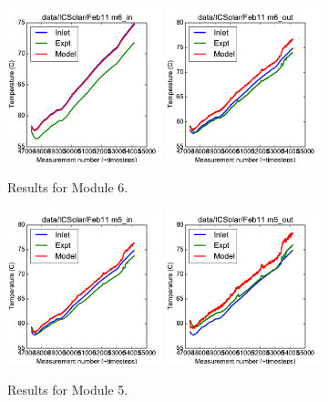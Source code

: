\documentclass{article}
\begin{document}
\begin{figure}[!ht]
\centering
\includegraphics[width=0.4\textwidth]{../../data/ICSolar/images/Feb11_m6_in_unsteady.pdf}\hspace{0.05\textwidth}
\includegraphics[width=0.4\textwidth]{../../data/ICSolar/images/Feb11_m6_out_unsteady.pdf}\hspace{0.05\textwidth}\\
\caption{Results for Module 6.}\end{figure}
\begin{figure}[!ht]
\centering
\includegraphics[width=0.4\textwidth]{../../data/ICSolar/images/Feb11_m5_in_unsteady.pdf}\hspace{0.05\textwidth}
\includegraphics[width=0.4\textwidth]{../../data/ICSolar/images/Feb11_m5_out_unsteady.pdf}\hspace{0.05\textwidth}\\
\caption{Results for Module 5.}\end{figure}
\end{document}
